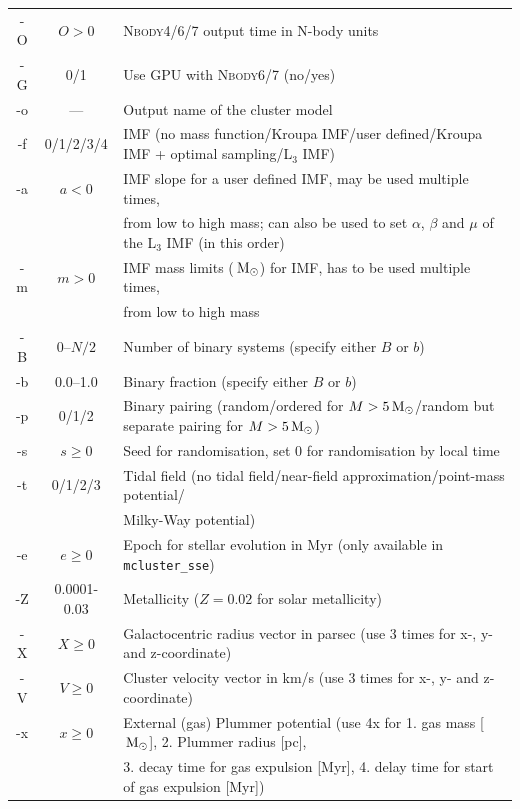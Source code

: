 \documentclass[useAMS,usenatbib]{mn2e}
\newcommand{\msun}{\mbox{$\,{\rm M}_\odot$}}
\begin{document}
\begin{table}
\begin{minipage}{\textwidth}
{\begin{tabular}{ccl}
      -O & $O>0$ & \textsc{Nbody4/6/7} output time in N-body units\\                           
      -G & 0/1 & Use GPU with \textsc{Nbody6/7} (no/yes)\\                   
      -o & --- & Output name of the cluster model\\                     
      -f & 0/1/2/3/4 & IMF (no mass function/Kroupa IMF/user defined/Kroupa IMF + optimal sampling/L$_3$ IMF)\\
      -a & $a<0$ & IMF slope for a user defined IMF, may be used multiple times,\\
      			&  &  from low to high mass; can also be used to set $\alpha$, $\beta$ and $\mu$ of the L$_3$ IMF (in this order)\\       
     -m & $m>0$ & IMF mass limits ($\msun$) for IMF, has to be used multiple times, \\
     			& & from low to high mass\\
      -B & 0--$N/2$ & Number of binary systems (specify either $B$ or $b$)\\                        
      -b & 0.0--1.0 & Binary fraction (specify either $B$ or $b$)\\           
      -p & 0/1/2 & Binary pairing (random/ordered for $M > 5 \msun$/random but separate pairing for  $M > 5 \msun$)\\  
      -s & $s\ge 0$& Seed for randomisation, set 0 for randomisation by local time\\   
      -t & 0/1/2/3 & Tidal field (no tidal field/near-field approximation/point-mass potential/\\
      			& & Milky-Way potential)\\           
      -e & $e\ge0$ & Epoch for stellar evolution in Myr (only available in \texttt{mcluster\_sse})\\                
      -Z & 0.0001-0.03 & Metallicity ($Z = 0.02$ for solar metallicity)\\          
      -X & $X\ge0$ & Galactocentric radius vector in parsec (use 3 times for x-, y- and z-coordinate)\\       
      -V & $V\ge0$ & Cluster velocity vector in km/s (use 3 times for x-, y- and z-coordinate)\\          
	-x & $x\ge0$ &  External (gas) Plummer potential (use 4x for 1. gas mass [$\msun$], 2. Plummer radius [pc],\\         
         & & 3. decay time for gas expulsion [Myr], 4. delay time for start of gas expulsion [Myr])  \\

\end{tabular}}
\end{minipage}
\end{table}
\end{document}
